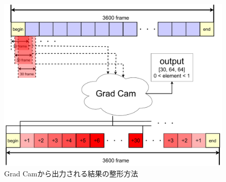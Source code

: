 \begin{figure}[b]
  \begin{center}
    \includegraphics[width=120mm]{images/chart/gradcam.pdf}
  \end{center}
  \caption{Grad Camから出力される結果の整形方法}
  \label{camgraph}
\end{figure}
\clearpage

